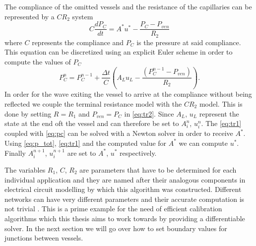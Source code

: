 \documentclass[a4paper, oneside]{discothesis}
\begin{document}
	The compliance of the omitted vessels and the resistance of the capillaries can be represented by a $CR_2$ system
	\begin{equation}
		C \frac{dP_C}{dt} = A^*u^* - \frac{P_C-P_{ven}}{R_2}
	\end{equation}
	where $C$ represents the compliance and $P_C$ is the pressure at said compliance.
	This equation can be discretized using an explicit Euler scheme in order to compute the values of $P_C$
	\begin{equation}
		P_C^n = P_C^{n-1} + \frac{\Delta t}{C} \left(A_Lu_L - \frac{ \left( P_C^{n-1} - P_{ven} \right)}{R_2} \right). \label{eq:pc}
	\end{equation}
	In order for the wave exiting the vessel to arrive at the compliance without being reflected we couple the terminal resistance model with the $CR_2$ model.
	This is done by setting $R=R_1$ and $P_{ven}=P_C$ in \autoref{eq:tr2}.
	Since $A_L$, $u_L$ represent the state at the end oft the vessel and can therefore be set to $A_i^n$, $u_i^n$.
	The \autoref{eq:tr1} coupled with \autoref{eq:pc} can be solved with a Newton solver\cite{atkinson1991introduction} in order to receive $A^*$.
	Using \autoref{eq:p_tot}, \autoref{eq:tr1} and the computed value for $A^*$ we can compute $u^*$.
	Finally $A_i^{n+1}$, $u_i^{n+1}$ are set to $A^*$, $u^*$ respectively. \cite{alastruey2008reduced}

	The variables $R_1$, $C$, $R_2$ are parameters that have to be determined for each individual application and they are named after their analogous components in electrical circuit modelling by which this algorithm was constructed.
	Different networks can have very different parameters and their accurate computation is not trivial \cite{köppl2023dimension}.
	This is a prime example for the need of efficient calibration algorithms which this thesis aims to work towards by providing a differentiable solver.
	In the next section we will go over how to set boundary values for junctions between vessels.
\end{document}
